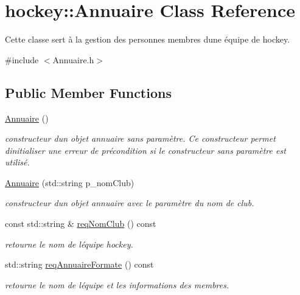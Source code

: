 \hypertarget{classhockey_1_1Annuaire}{}\section{hockey\+:\+:Annuaire Class Reference}
\label{classhockey_1_1Annuaire}


Cette classe sert à la gestion des personnes membres d\textquotesingle{}une équipe de hockey.  




{\ttfamily \#include $<$Annuaire.\+h$>$}

\subsection*{Public Member Functions}
\begin{DoxyCompactItemize}
\item 
\mbox{\label{classhockey_1_1Annuaire_ad81beccf0e9a6e54074ae0875360c25a}} 
\hyperlink{classhockey_1_1Annuaire_ad81beccf0e9a6e54074ae0875360c25a}{Annuaire} ()
\begin{DoxyCompactList}\small\item\em constructeur d\textquotesingle{}un objet annuaire sans paramètre. Ce constructeur permet d\textquotesingle{}initialiser une erreur de précondition si le constructeur sans paramètre est utilisé. \end{DoxyCompactList}\item 
\hyperlink{classhockey_1_1Annuaire_ac756b17e484628d1e5386e9252f26d65}{Annuaire} (std\+::string p\+\_\+nom\+Club)
\begin{DoxyCompactList}\small\item\em constructeur d\textquotesingle{}un objet annuaire avec le paramètre du nom de club. \end{DoxyCompactList}\item 
const std\+::string \& \hyperlink{classhockey_1_1Annuaire_a72d2cf91ab310b2f36011ba4639bdcf3}{req\+Nom\+Club} () const
\begin{DoxyCompactList}\small\item\em retourne le nom de l\textquotesingle{}équipe hockey. \end{DoxyCompactList}\item 
std\+::string \hyperlink{classhockey_1_1Annuaire_acc3c0ae6f56007b2c54d3ef2765c6297}{req\+Annuaire\+Formate} () const
\begin{DoxyCompactList}\small\item\em retourne le nom de l\textquotesingle{}équipe et les informations des membres. \end{DoxyCompactList}\item 

\end{DoxyCompactItemize}
